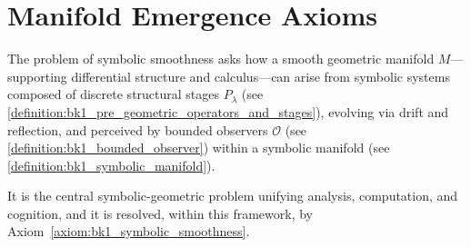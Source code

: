 \section{Manifold Emergence Axioms}
\label{sec:bk1_manifold_emergence_axioms}

\begin{definition}
\label{definition:bk1_problem_of_symbolic_smoothness}
The problem of symbolic smoothness asks how a smooth geometric manifold $M$—supporting differential structure and calculus—can arise from symbolic systems composed of discrete structural stages $P_\lambda$ (see \ref{definition:bk1_pre_geometric_operators_and_stages}), evolving via drift and reflection, and perceived by bounded observers $\mathcal{O}$ (see \ref{definition:bk1_bounded_observer}) within a symbolic manifold (see \ref{definition:bk1_symbolic_manifold}).

It is the central symbolic-geometric problem unifying analysis, computation, and cognition, and it is resolved, within this framework, by Axiom~\ref{axiom:bk1_symbolic_smoothness}.
\end{definition}

